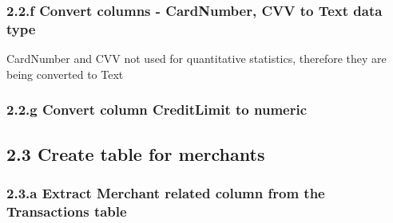 \documentclass[
]{article}
\newenvironment{Shaded}{\begin{snugshade}}{\end{snugshade}}
\newcommand{\FunctionTok}[1]{\textcolor[rgb]{0.13,0.29,0.53}{\textbf{#1}}}
\newcommand{\NormalTok}[1]{#1}
\newcommand{\OtherTok}[1]{\textcolor[rgb]{0.56,0.35,0.01}{#1}}
\newcommand{\SpecialCharTok}[1]{\textcolor[rgb]{0.81,0.36,0.00}{\textbf{#1}}}
\newcommand{\StringTok}[1]{\textcolor[rgb]{0.31,0.60,0.02}{#1}}
\begin{document}
\subsubsection{2.2.f Convert columns - CardNumber, CVV to Text data
type}\label{f-convert-columns---cardnumber-cvv-to-text-data-type}

CardNumber and CVV not used for quantitative statistics, therefore they
are being converted to Text

\begin{Shaded}
\end{Shaded}

\subsubsection{2.2.g Convert column CreditLimit to
numeric}\label{g-convert-column-creditlimit-to-numeric}

\begin{Shaded}
\end{Shaded}

\subsection{2.3 Create table for
merchants}\label{create-table-for-merchants}

\subsubsection{2.3.a Extract Merchant related column from the
Transactions
table}\label{a-extract-merchant-related-column-from-the-transactions-table}
\end{document}
